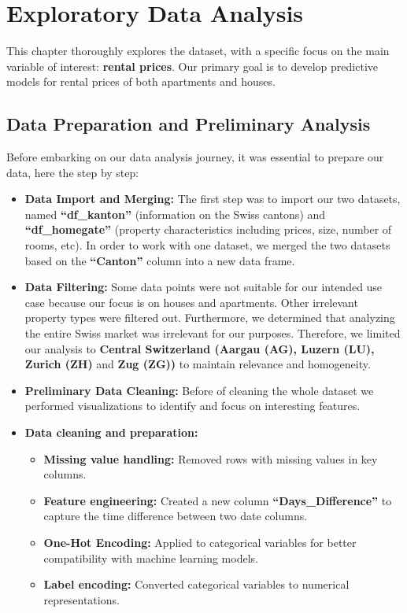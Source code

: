 \documentclass[
]{article}
\begin{document}
\section{Exploratory Data Analysis}\label{exploratory-data-analysis}

This chapter thoroughly explores the dataset, with a specific focus on
the main variable of interest: \textbf{rental prices}. Our primary goal
is to develop predictive models for rental prices of both apartments and
houses.

\subsection{Data Preparation and Preliminary
Analysis}\label{data-preparation-and-preliminary-analysis}

Before embarking on our data analysis journey, it was essential to
prepare our data, here the step by step:

\begin{itemize}
\item
  \textbf{Data Import and Merging:} The first step was to import our two
  datasets, named \textbf{``df\_kanton''} (information on the Swiss
  cantons) and \textbf{``df\_homegate''} (property characteristics
  including prices, size, number of rooms, etc). In order to work with
  one dataset, we merged the two datasets based on the
  \textbf{``Canton''} column into a new data frame.
\item
  \textbf{Data Filtering:} Some data points were not suitable for our
  intended use case because our focus is on houses and apartments. Other
  irrelevant property types were filtered out. Furthermore, we
  determined that analyzing the entire Swiss market was irrelevant for
  our purposes. Therefore, we limited our analysis to \textbf{Central
  Switzerland (Aargau (AG), Luzern (LU), Zurich (ZH)} and \textbf{Zug
  (ZG))} to maintain relevance and homogeneity.
\item
  \textbf{Preliminary Data Cleaning:} Before of cleaning the whole
  dataset we performed visualizations to identify and focus on
  interesting features.
\item
  \textbf{Data cleaning and preparation:}

  \begin{itemize}
  \item
    \textbf{Missing value handling:} Removed rows with missing values in
    key columns.
  \item
    \textbf{Feature engineering:} Created a new column
    \textbf{``Days\_Difference''} to capture the time difference between
    two date columns.
  \item
    \textbf{One-Hot Encoding:} Applied to categorical variables for
    better compatibility with machine learning models.
  \item
    \textbf{Label encoding:} Converted categorical variables to
    numerical representations.
  \end{itemize}
\end{itemize}
\end{document}
